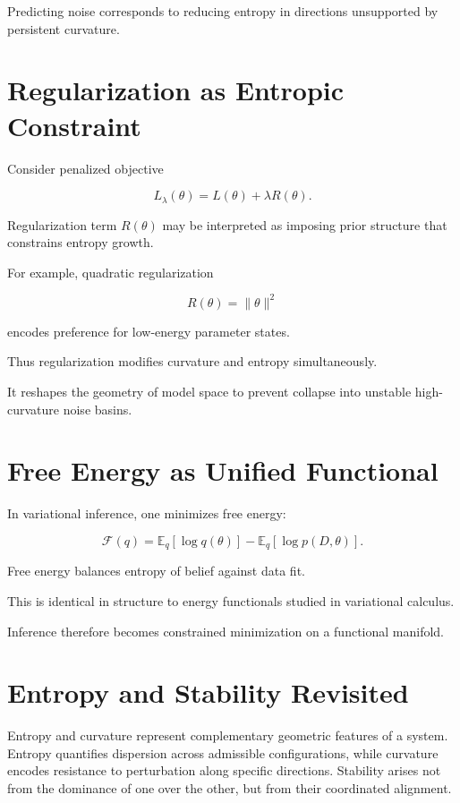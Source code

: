\documentclass[12pt]{book}
\begin{document}
Predicting noise corresponds to reducing entropy in directions unsupported by persistent curvature.

\section{Regularization as Entropic Constraint}

Consider penalized objective

\[
L_{\lambda}(\theta) = L(\theta) + \lambda R(\theta).
\]

Regularization term $R(\theta)$ may be interpreted as imposing prior structure that constrains entropy growth.

For example, quadratic regularization

\[
R(\theta) = \|\theta\|^2
\]

encodes preference for low-energy parameter states.

Thus regularization modifies curvature and entropy simultaneously.

It reshapes the geometry of model space to prevent collapse into unstable high-curvature noise basins.

\section{Free Energy as Unified Functional}

In variational inference, one minimizes free energy:

\[
\mathcal{F}(q)
=
\mathbb{E}_{q}[\log q(\theta)]
-
\mathbb{E}_{q}[\log p(D,\theta)].
\]

Free energy balances entropy of belief against data fit.

This is identical in structure to energy functionals studied in variational calculus.

Inference therefore becomes constrained minimization on a functional manifold.

\section{Entropy and Stability Revisited}

Entropy and curvature represent complementary geometric features of a system. Entropy quantifies dispersion across admissible configurations, while curvature encodes resistance to perturbation along specific directions. Stability arises not from the dominance of one over the other, but from their coordinated alignment.
\end{document}
